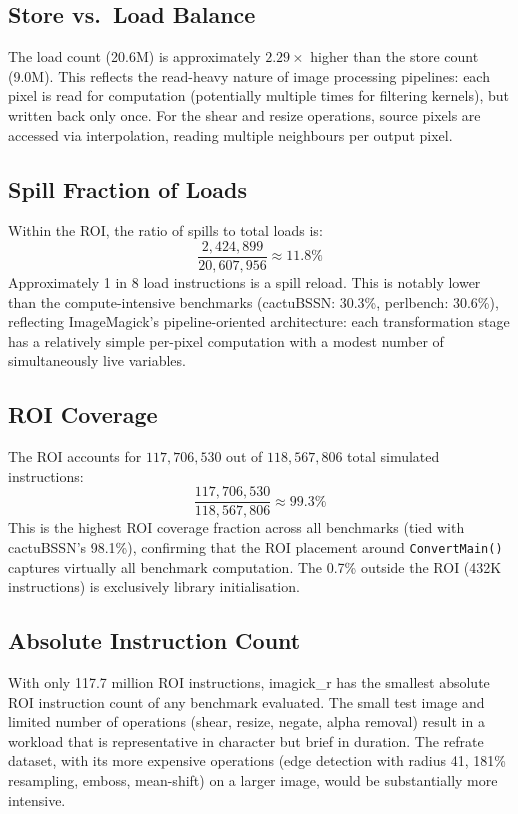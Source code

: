 \documentclass[conference]{IEEEtran}
\begin{document}
\subsection{Store vs.\ Load Balance}

The load count (20.6M) is approximately $2.29\times$ higher than the
store count (9.0M). This reflects the read-heavy nature of image
processing pipelines: each pixel is read for computation (potentially
multiple times for filtering kernels), but written back only once.
For the shear and resize operations, source pixels are accessed via
interpolation, reading multiple neighbours per output pixel.

\subsection{Spill Fraction of Loads}

Within the ROI, the ratio of spills to total loads is:
\[
\frac{2{,}424{,}899}{20{,}607{,}956} \approx 11.8\%
\]
Approximately 1 in 8 load instructions is a spill reload. This is
notably lower than the compute-intensive benchmarks (cactuBSSN: 30.3\%,
perlbench: 30.6\%), reflecting ImageMagick's pipeline-oriented
architecture: each transformation stage has a relatively simple
per-pixel computation with a modest number of simultaneously live
variables.

\subsection{ROI Coverage}

The ROI accounts for $117{,}706{,}530$ out of $118{,}567{,}806$
total simulated instructions:
\[
\frac{117{,}706{,}530}{118{,}567{,}806} \approx 99.3\%
\]
This is the highest ROI coverage fraction across all benchmarks
(tied with cactuBSSN's 98.1\%), confirming that the ROI placement
around \texttt{ConvertMain()} captures virtually all benchmark
computation. The 0.7\% outside the ROI (432K instructions) is
exclusively library initialisation.

\subsection{Absolute Instruction Count}

With only 117.7 million ROI instructions, imagick\_r has the smallest
absolute ROI instruction count of any benchmark evaluated. The small
test image and limited number of operations (shear, resize, negate,
alpha removal) result in a workload that is representative in character
but brief in duration. The refrate dataset, with its more expensive
operations (edge detection with radius 41, 181\% resampling, emboss,
mean-shift) on a larger image, would be substantially more intensive.
\end{document}
